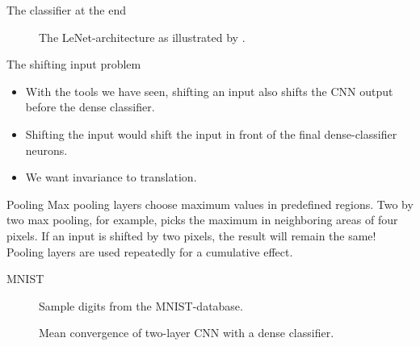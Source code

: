 \documentclass{beamer}
\begin{document}
    \begin{frame}{The classifier at the end}
        \begin{figure}
        
        \caption{The LeNet-architecture\cite{lecun1989handwritten} as illustrated by \cite{StutzCNN}.}
        \end{figure}
    \end{frame}

    \begin{frame}{The shifting input problem}
        \begin{itemize}
            \item With the tools we have seen, shifting an input also shifts the CNN output before the dense classifier.
            \item Shifting the input would shift the input in front of the final dense-classifier neurons.
            \item We want invariance to translation.
        \end{itemize}
    \end{frame}


    \begin{frame}{Pooling}
        Max pooling layers choose maximum values in predefined regions.
        Two by two max pooling, for example, picks the maximum in neighboring areas of four pixels.
        If an input is shifted by two pixels, the result will remain the same!
        Pooling layers are used repeatedly for a cumulative effect.
    \end{frame}

    \begin{frame}{MNIST}
        \begin{figure}
            
            \caption{Sample digits from the MNIST-database.}
        \end{figure}
        \begin{figure}
            
            \caption{Mean convergence of two-layer CNN with a dense classifier.}
        \end{figure}
    \end{frame}
\end{document}
